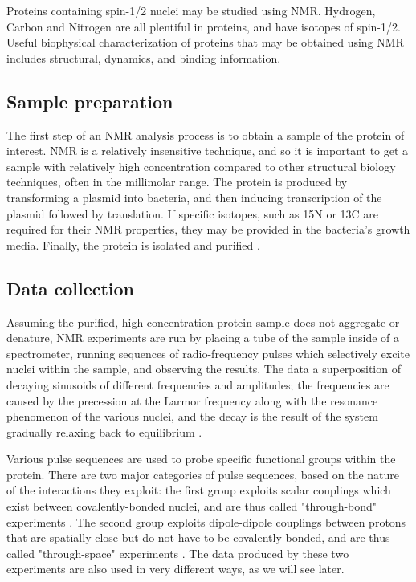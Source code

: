 Proteins containing spin-1/2 nuclei may be studied using NMR.  Hydrogen, 
Carbon and Nitrogen are all plentiful in proteins, and have isotopes of 
spin-1/2.  Useful biophysical characterization of proteins that may be 
obtained using NMR includes structural, dynamics, and binding information.

\subsection*{Sample preparation}

The first step of an NMR analysis process is to obtain a sample of the protein
of interest.  NMR is a relatively insensitive technique, and so it is important
to get a sample with relatively high concentration compared to other structural
biology techniques, often in the millimolar range.  The protein is produced
by transforming a plasmid into bacteria, and then inducing transcription 
of the plasmid followed by translation.  If specific isotopes, such as 15N or 
13C are required for their NMR properties, they may be provided in the 
bacteria's growth media.  Finally, the protein is isolated and purified
\cite{derome1987modern}.

\subsection*{Data collection}

Assuming the purified, high-concentration protein sample does not aggregate
or denature, NMR experiments are run by placing a tube of the sample inside 
of a spectrometer, running sequences of radio-frequency pulses which selectively
excite nuclei within the sample, and observing the results.  The data a 
superposition of decaying sinusoids of different frequencies and amplitudes;
the frequencies are caused by the precession at the Larmor frequency along with
the resonance phenomenon of the various nuclei, and the decay is the result
of the system gradually relaxing back to equilibrium \cite{bloch1946nuclear}.

Various pulse sequences are used to probe specific functional groups within
the protein.  There are two major categories of pulse sequences, based on the
nature of the interactions they exploit: the first group exploits scalar 
couplings which exist between covalently-bonded nuclei, and are thus called 
"through-bond" experiments \cite{davis1985assignment}.  
The second group exploits dipole-dipole couplings
between protons that are spatially close but do not have to be covalently
bonded, and are thus called "through-space" experiments
\cite{solomon1955relaxation}.  The data produced by
these two experiments are also used in very different ways, as we will see
later.

